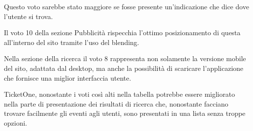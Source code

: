 Questo voto sarebbe stato maggiore se fosse presente un'indicazione che dice dove l'utente si trova.
\par Il voto 10 della sezione Pubblicità rispecchia l'ottimo posizionamento di questa all'interno del sito tramite l'uso del blending.
\par Nella sezione della ricerca il voto 8 rappresenta non solamente la versione mobile del sito, adattata dal desktop, ma anche la possibilità di scaricare l'applicazione che fornisce una miglior interfaccia utente.
\par TicketOne, nonostante i voti così alti nella tabella potrebbe essere migliorato nella parte di presentazione dei risultati di ricerca che, nonostante facciano trovare facilmente gli eventi agli utenti, sono presentati in una lista senza troppe opzioni.
